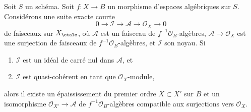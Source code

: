\begin{lemma}
\label{lemma-first-order-thickening}
Soit $S$ un schéma.
Soit $f : X \to B$ un morphisme d'espaces algébriques sur $S$.
Considérons une suite exacte courte
$$
0 \to \mathcal{I} \to \mathcal{A} \to \mathcal{O}_X \to 0
$$
de faisceaux sur $X_\etale$, où $\mathcal{A}$ est un faisceau de
$f^{-1}\mathcal{O}_B$-algèbres, $\mathcal{A} \to \mathcal{O}_X$ est une surjection
de faisceaux de $f^{-1}\mathcal{O}_B$-algèbres, et $\mathcal{I}$ son noyau.
Si
\begin{enumerate}
\item $\mathcal{I}$ est un idéal de carré nul dans $\mathcal{A}$, et
\item $\mathcal{I}$ est quasi-cohérent en tant que $\mathcal{O}_X$-module,
\end{enumerate}
alors il existe un épaississement du premier ordre
$X \subset X'$ sur $B$ et un isomorphisme
$\mathcal{O}_{X'} \to \mathcal{A}$ de $f^{-1}\mathcal{O}_B$-algèbres
compatible aux surjections vers $\mathcal{O}_X$.
\end{lemma}

